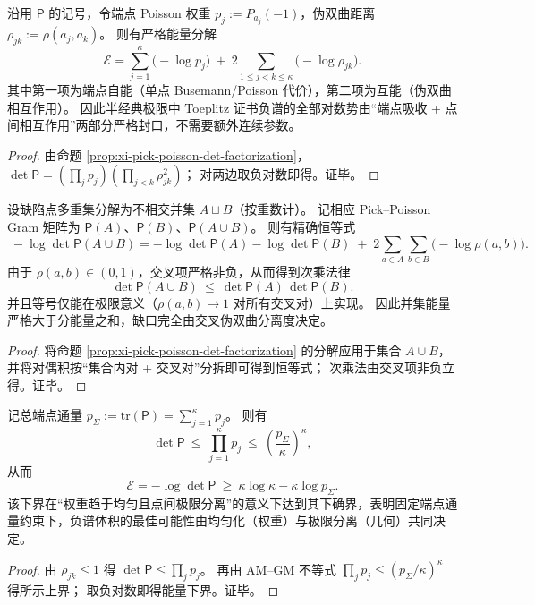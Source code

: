\begin{corollary}\label{cor:xi-pick-poisson-energy-coulomb-decomposition}
沿用 \(\mathsf P\) 的记号，令端点 Poisson 权重 \(p_j:=P_{a_j}(-1)\)，伪双曲距离 \(\rho_{jk}:=\rho(a_j,a_k)\)。
则有严格能量分解
\[
\boxed{\;
\mathcal{E}
=\sum_{j=1}^{\kappa}\bigl(-\log p_j\bigr)\ +\ 2\sum_{1\le j<k\le\kappa}\bigl(-\log\rho_{jk}\bigr).\;}
\]
其中第一项为端点自能（单点 Busemann/Poisson 代价），第二项为互能（伪双曲相互作用）。
因此半经典极限中 Toeplitz 证书负谱的全部对数势由“端点吸收 + 点间相互作用”两部分严格封口，不需要额外连续参数。
\end{corollary}
\begin{proof}
由命题 \ref{prop:xi-pick-poisson-det-factorization}，
\(
\det\mathsf P=(\prod_j p_j)(\prod_{j<k}\rho_{jk}^2)
\)；
对两边取负对数即得。证毕。
\end{proof}

\begin{proposition}\label{prop:xi-pick-poisson-union-submultiplicativity-cross-energy}
设缺陷点多重集分解为不相交并集 \(A\sqcup B\)（按重数计）。
记相应 Pick--Poisson Gram 矩阵为 \(\mathsf P(A)\)、\(\mathsf P(B)\)、\(\mathsf P(A\cup B)\)。
则有精确恒等式
\[
\boxed{\;
-\log\det\mathsf P(A\cup B)
=-\log\det\mathsf P(A)-\log\det\mathsf P(B)
\;+\;2\sum_{a\in A}\sum_{b\in B}\bigl(-\log\rho(a,b)\bigr).\;}
\]
由于 \(\rho(a,b)\in(0,1)\)，交叉项严格非负，从而得到次乘法律
\[
\boxed{\;
\det\mathsf P(A\cup B)\ \le\ \det\mathsf P(A)\,\det\mathsf P(B).\;}
\]
并且等号仅能在极限意义（\(\rho(a,b)\to 1\) 对所有交叉对）上实现。
因此并集能量严格大于分能量之和，缺口完全由交叉伪双曲分离度决定。
\end{proposition}
\begin{proof}
将命题 \ref{prop:xi-pick-poisson-det-factorization} 的分解应用于集合 \(A\cup B\)，并将对偶积按“集合内对 + 交叉对”分拆即可得到恒等式；
次乘法由交叉项非负立得。证毕。
\end{proof}

\begin{corollary}\label{cor:xi-pick-poisson-energy-fixed-flux-extremal}
记总端点通量 \(p_\Sigma:=\mathrm{tr}(\mathsf P)=\sum_{j=1}^{\kappa}p_j\)。
则有
\[
\boxed{\;
\det\mathsf P\ \le\ \prod_{j=1}^{\kappa}p_j\ \le\ \left(\frac{p_\Sigma}{\kappa}\right)^{\kappa},\;}
\]
从而
\[
\boxed{\;
\mathcal{E}=-\log\det\mathsf P\ \ge\ \kappa\log\kappa-\kappa\log p_\Sigma.\;}
\]
该下界在“权重趋于均匀且点间极限分离”的意义下达到其下确界，表明固定端点通量约束下，负谱体积的最佳可能性由均匀化（权重）与极限分离（几何）共同决定。
\end{corollary}
\begin{proof}
由 \(\rho_{jk}\le 1\) 得 \(\det\mathsf P\le \prod_j p_j\)。
再由 AM--GM 不等式 \(\prod_j p_j\le (p_\Sigma/\kappa)^\kappa\) 得所示上界；
取负对数即得能量下界。证毕。
\end{proof}

